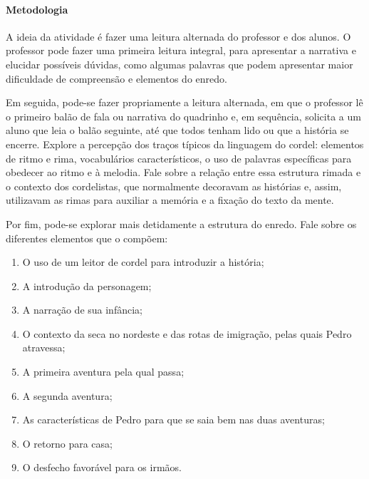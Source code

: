 \documentclass[11pt]{extarticle}
\begin{document}
\paragraph{Metodologia} A ideia da atividade é fazer uma leitura alternada do professor e dos alunos. O professor pode fazer uma primeira leitura integral, para apresentar a narrativa e elucidar possíveis dúvidas, como algumas palavras que podem apresentar maior dificuldade de compreensão e elementos do enredo.

Em seguida, pode-se fazer propriamente a leitura alternada, em que o professor lê o primeiro balão de fala ou narrativa do quadrinho e, em sequência, solicita a um aluno que leia o balão seguinte, até que todos tenham lido ou que a história se encerre.
Explore a percepção dos traços típicos da linguagem do cordel: elementos de ritmo e rima, vocabulários característicos, o uso de palavras específicas para obedecer ao ritmo e à melodia. Fale sobre a relação entre essa estrutura rimada e o contexto dos cordelistas, que normalmente decoravam as histórias e, assim, utilizavam as rimas para auxiliar a memória e a fixação do texto da mente.

Por fim, pode-se explorar mais detidamente a estrutura do enredo. Fale sobre os diferentes elementos que o compõem:

\begin{enumerate}
\item O uso de um leitor de cordel para introduzir a história;

\item A introdução da personagem;

\item A narração de sua infância;

\item O contexto da seca no nordeste e das rotas de imigração, pelas quais Pedro atravessa;

\item A primeira aventura pela qual passa;

\item A segunda aventura;

\item As características de Pedro para que se saia bem nas duas aventuras;

\item O retorno para casa;

\item O desfecho favorável para os irmãos.
\end{enumerate}
\end{document}
